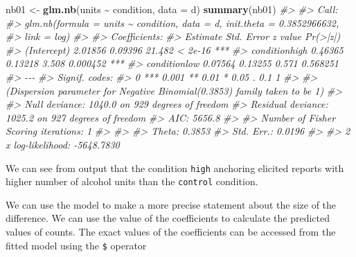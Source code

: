 \documentclass[
]{book}
\newenvironment{Shaded}{\begin{snugshade}}{\end{snugshade}}
\newcommand{\AttributeTok}[1]{\textcolor[rgb]{0.13,0.29,0.53}{#1}}
\newcommand{\CommentTok}[1]{\textcolor[rgb]{0.56,0.35,0.01}{\textit{#1}}}
\newcommand{\FunctionTok}[1]{\textcolor[rgb]{0.13,0.29,0.53}{\textbf{#1}}}
\newcommand{\NormalTok}[1]{#1}
\newcommand{\OtherTok}[1]{\textcolor[rgb]{0.56,0.35,0.01}{#1}}
\newcommand{\SpecialCharTok}[1]{\textcolor[rgb]{0.81,0.36,0.00}{\textbf{#1}}}
\begin{document}
\begin{Shaded}
\begin{Highlighting}[]
\NormalTok{nb01 }\OtherTok{\textless{}{-}} \FunctionTok{glm.nb}\NormalTok{(units }\SpecialCharTok{\textasciitilde{}}\NormalTok{ condition, }\AttributeTok{data =}\NormalTok{ d)}
\FunctionTok{summary}\NormalTok{(nb01)}
\CommentTok{\#\textgreater{} }
\CommentTok{\#\textgreater{} Call:}
\CommentTok{\#\textgreater{} glm.nb(formula = units \textasciitilde{} condition, data = d, init.theta = 0.3852966632, }
\CommentTok{\#\textgreater{}     link = log)}
\CommentTok{\#\textgreater{} }
\CommentTok{\#\textgreater{} Coefficients:}
\CommentTok{\#\textgreater{}               Estimate Std. Error z value Pr(\textgreater{}|z|)    }
\CommentTok{\#\textgreater{} (Intercept)    2.01856    0.09396  21.482  \textless{} 2e{-}16 ***}
\CommentTok{\#\textgreater{} conditionhigh  0.46365    0.13218   3.508 0.000452 ***}
\CommentTok{\#\textgreater{} conditionlow   0.07564    0.13255   0.571 0.568251    }
\CommentTok{\#\textgreater{} {-}{-}{-}}
\CommentTok{\#\textgreater{} Signif. codes:  }
\CommentTok{\#\textgreater{} 0 \textquotesingle{}***\textquotesingle{} 0.001 \textquotesingle{}**\textquotesingle{} 0.01 \textquotesingle{}*\textquotesingle{} 0.05 \textquotesingle{}.\textquotesingle{} 0.1 \textquotesingle{} \textquotesingle{} 1}
\CommentTok{\#\textgreater{} }
\CommentTok{\#\textgreater{} (Dispersion parameter for Negative Binomial(0.3853) family taken to be 1)}
\CommentTok{\#\textgreater{} }
\CommentTok{\#\textgreater{}     Null deviance: 1040.0  on 929  degrees of freedom}
\CommentTok{\#\textgreater{} Residual deviance: 1025.2  on 927  degrees of freedom}
\CommentTok{\#\textgreater{} AIC: 5656.8}
\CommentTok{\#\textgreater{} }
\CommentTok{\#\textgreater{} Number of Fisher Scoring iterations: 1}
\CommentTok{\#\textgreater{} }
\CommentTok{\#\textgreater{} }
\CommentTok{\#\textgreater{}               Theta:  0.3853 }
\CommentTok{\#\textgreater{}           Std. Err.:  0.0196 }
\CommentTok{\#\textgreater{} }
\CommentTok{\#\textgreater{}  2 x log{-}likelihood:  {-}5648.7830}
\end{Highlighting}
\end{Shaded}

We can see from output that the condition \texttt{high} anchoring elicited reports with higher number of alcohol units than the \texttt{control} condition.

We can use the model to make a more precise statement about the size of the difference. We can use the value of the coefficients to calculate the predicted values of counts. The exact values of the coefficients can be accessed from the fitted model using the \texttt{\$} operator
\end{document}
